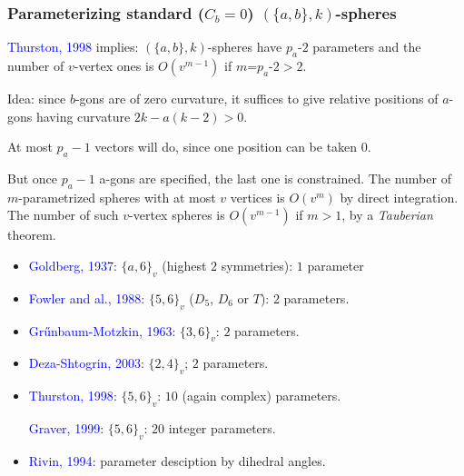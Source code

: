 \documentclass{beamer}
\begin{document}
\begin{frame}\frametitle{Parameterizing standard ($C_b=0$) 
$(\{a,b\},k)$-spheres}
\vspace{-3mm}

\textcolor{blue}{Thurston, 1998} implies: $(\{a,b\},k)$-spheres
 have $p_{a}$-$2$ parameters and the number of $v$-vertex ones is
$O(v^{m-1})$ if $m$=$p_a$-$2>2$.

Idea: since $b$-gons are of zero curvature, 
it suffices to give relative
positions of $a$-gons having curvature $2k-a(k-2)>0$.

At most $p_a-1$ vectors will do, since one position can be 
taken 
$0$.

But once $p_a-1$ a-gons are specified, the 
last one is constrained.
The number of $m$-parametrized spheres with at most $v$ vertices is $O(v^m)$ by direct 
integration.
The number of such $v$-vertex spheres is $O(v^{m-1})$ if $m>1$, by 
a {\em Tauberian} theorem.
\pause

\begin{itemize}
\item \textcolor{blue}{Goldberg, 1937}:  $\{a,6\}_v$ (highest $2$ symmetries): $1$ 
parameter
\item \textcolor{blue}{Fowler and al., 1988}: $\{5,6\}_v$ ($D_5$, $D_6$ or $T$): $2$ 
parameters. 


\item \textcolor{blue}{Gr\H{u}nbaum-Motzkin, 1963}: $\{3,6\}_v$: $2$ parameters.
\item   \textcolor{blue}{Deza-Shtogrin, 2003}:
$\{2,4\}_v$; $2$ 
parameters.
\item \textcolor{blue}{Thurston, 1998}:  $\{5,6\}_v$: $10$
(again complex) parameters. 

\textcolor{blue}{Graver, 1999}: $\{5,6\}_v$: $20$
integer parameters.

\item \textcolor{blue}{Rivin, 1994}: 
parameter desciption by dihedral angles.
\end{itemize}

\end{frame}
\end{document}
